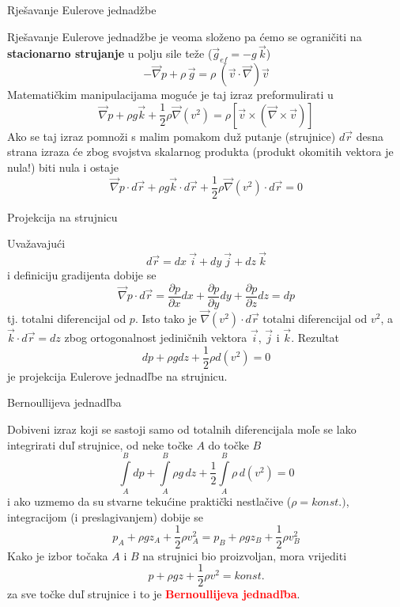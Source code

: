 \documentclass[croatian]{beamer}
\begin{document}
\begin{frame}{Rješavanje Eulerove jednadžbe}

Rješavanje Eulerove jednadžbe je veoma složeno pa ćemo se ograničiti
na \textbf{stacionarno strujanje }u polju sile teže ($\vec{g}_{ef}=-g\,\vec{k}$)
\[
-\vec{\nabla}p+\rho\,\vec{g}=\rho\:(\vec{v}\cdot\vec{\nabla})\vec{v}
\]
Matematičkim manipulacijama moguće je taj izraz preformulirati u
\[
\vec{\nabla}p+\rho g\vec{k}+\frac{1}{2}\rho\vec{\nabla}(v^{2})=\rho[\vec{v}\times(\vec{\nabla}\times\vec{v})]
\]
Ako se taj izraz pomnoži s malim pomakom duž putanje (strujnice) $d\vec{r}$
desna strana izraza će zbog svojstva skalarnog produkta (produkt okomitih
vektora je nula!) biti nula i ostaje 
\[
\vec{\nabla}p\cdot d\vec{r}+\rho g\vec{k}\cdot d\vec{r}+\frac{1}{2}\rho\vec{\nabla}(v^{2})\cdot d\vec{r}=0
\]
\end{frame}

\begin{frame}{Projekcija na strujnicu}

Uvažavajući 
\[
d\vec{r}=dx\:\vec{i}+dy\:\vec{j}+dz\:\vec{k}
\]
i definiciju gradijenta dobije se 
\[
\vec{\nabla}p\cdot d\vec{r}=\frac{\partial p}{\partial x}dx+\frac{\partial p}{\partial y}dy+\frac{\partial p}{\partial z}dz=dp
\]
tj. totalni diferencijal od $p$. Isto tako je $\vec{\nabla}(v^{2})\cdot d\vec{r}$
totalni diferencijal od $v^{2}$, a $\vec{k}\cdot d\vec{r}=dz$ zbog
ortogonalnost jediničnih vektora $\vec{i}$, $\vec{j}$ i $\vec{k}$.
Rezultat 
\[
dp+\rho gdz+\frac{1}{2}\rho d(v^{2})=0
\]
je projekcija Eulerove jednadľbe na strujnicu.
\end{frame}

\begin{frame}{Bernoullijeva jednadľba}

Dobiveni izraz koji se sastoji samo od totalnih diferencijala moľe
se lako integrirati duľ strujnice, od neke točke $A$ do točke $B$
\[
\int\limits _{A}^{B}dp+\int\limits _{A}^{B}\rho g\,dz+\frac{1}{2}\int\limits _{A}^{B}\rho\,d(v^{2})=0
\]
i ako uzmemo da su stvarne tekućine praktički nestlačive ($\rho=konst.)$,
integracijom (i preslagivanjem) dobije se 
\[
p_{{\scriptscriptstyle A}}+\rho gz_{{\scriptscriptstyle A}}+\frac{1}{2}\rho v_{{\scriptscriptstyle A}}^{2}=p_{{\scriptscriptstyle B}}+\rho gz_{{\scriptscriptstyle B}}+\frac{1}{2}\rho v_{{\scriptscriptstyle B}}^{2}
\]
Kako je izbor točaka $A$ i $B$ na strujnici bio proizvoljan, mora
vrijediti 
\[
p+\rho gz+\frac{1}{2}\rho v^{2}=konst.
\]
za sve točke duľ strujnice i to je \textbf{\textcolor{red}{Bernoullijeva
jednadľba}}.
\end{frame}
\end{document}
